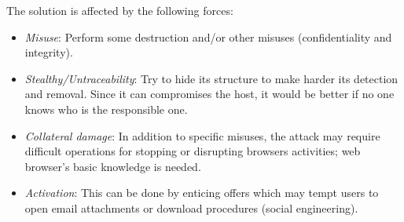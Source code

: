 \documentclass{sig-alternate-05-2015}
\begin{document}
The solution is affected by the following forces:
\begin{itemize}
  \item \textit{Misuse}: Perform some destruction and/or other misuses (confidentiality and integrity).
  \item \textit{Stealthy/Untraceability}: Try to hide its structure to make harder its detection and removal. Since it can compromises the host, it would be better if no one knows who is the responsible one. 
  \item \textit{Collateral damage}: In addition to specific misuses, the attack may require difficult operations for stopping or disrupting browsers activities; web browser's basic knowledge is needed.
  \item \textit{Activation}: This can be done by enticing offers which may tempt users to open email attachments or download procedures (social engineering).
\end{itemize}
\end{document}
